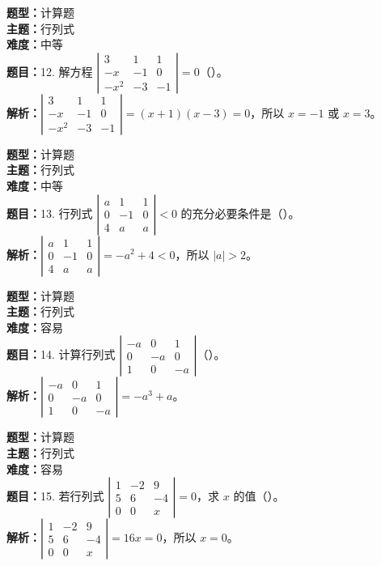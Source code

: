\documentclass{ctexart}
\newenvironment{question}[5]{%
	\noindent\textbf{题型：}#1\\
	\textbf{主题：}#2\\
	\textbf{难度：}#3\\
	\textbf{题目：}#4\\
	\textbf{解析：}#5\\
	\vspace{1em}
}{}
\begin{document}
\begin{question} 
	{计算题} 
	{行列式}
	{中等}
	{12. 解方程 $\left|\begin{array}{ccc}3 & 1 & 1 \\ -x & -1 & 0 \\ -x^2 & -3 & -1\end{array}\right|=0$（）。}
	{$\left|\begin{array}{ccc}3 & 1 & 1 \\ -x & -1 & 0 \\ -x^2 & -3 & -1\end{array}\right| = (x+1)(x-3) = 0$，所以 $x = -1$ 或 $x = 3$。}
\end{question}

\begin{question} 
	{计算题} 
	{行列式}
	{中等}
	{13. 行列式 $\left|\begin{array}{ccc}a & 1 & 1 \\ 0 & -1 & 0 \\ 4 & a & a\end{array}\right|<0$ 的充分必要条件是（）。}
	{$\left|\begin{array}{ccc}a & 1 & 1 \\ 0 & -1 & 0 \\ 4 & a & a\end{array}\right| = -a^2 + 4 < 0$，所以 $|a| > 2$。}
\end{question}

\begin{question} 
	{计算题} 
	{行列式}
	{容易}
	{14. 计算行列式 $\left|\begin{array}{ccc}-a & 0 & 1 \\ 0 & -a & 0 \\ 1 & 0 & -a\end{array}\right|$（）。}
	{$\left|\begin{array}{ccc}-a & 0 & 1 \\ 0 & -a & 0 \\ 1 & 0 & -a\end{array}\right| = -a^3 + a$。}
\end{question}

\begin{question} 
	{计算题} 
	{行列式}
	{容易}
	{15. 若行列式 $\left|\begin{array}{ccc}1 & -2 & 9 \\ 5 & 6 & -4 \\ 0 & 0 & x\end{array}\right| = 0$，求 $x$ 的值（）。}
	{$\left|\begin{array}{ccc}1 & -2 & 9 \\ 5 & 6 & -4 \\ 0 & 0 & x\end{array}\right| = 16x = 0$，所以 $x = 0$。}
\end{question}
\end{document}
